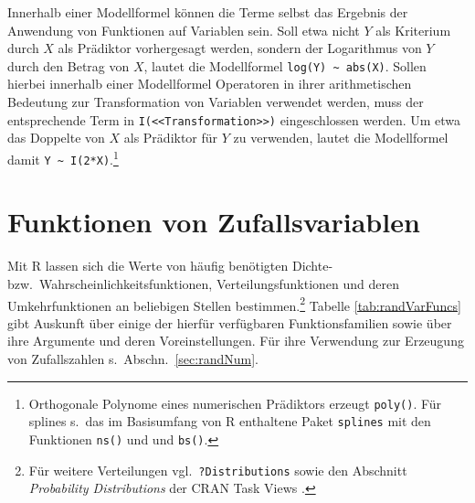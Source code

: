 Innerhalb einer Modellformel können die Terme selbst das Ergebnis der Anwendung von Funktionen auf Variablen sein. Soll etwa nicht $Y$ als Kriterium durch $X$ als Prädiktor vorhergesagt werden, sondern der Logarithmus von $Y$ durch den Betrag von $X$, lautet die Modellformel \lstinline!log(Y) ~ abs(X)!. Sollen hierbei innerhalb einer Modellformel Operatoren in ihrer arithmetischen Bedeutung zur Transformation von Variablen verwendet werden, muss der entsprechende Term in \lstinline!I(<<Transformation>>)! eingeschlossen werden. Um etwa das Doppelte von $X$ als Prädiktor für $Y$ zu verwenden, lautet die Modellformel damit \lstinline!Y ~ I(2*X)!.\footnote{Orthogonale Polynome eines numerischen Prädiktors erzeugt \lstinline!poly()!. Für splines s.\ das im Basisumfang von R enthaltene Paket \lstinline!splines! mit den Funktionen \lstinline!ns()! und und \lstinline!bs()!.}

\section{Funktionen von Zufallsvariablen}
\label{sec:randVarFuncs}

Mit R lassen sich die Werte von häufig benötigten Dichte- bzw.\ Wahrscheinlichkeitsfunktionen, Verteilungsfunktionen und deren Umkehrfunktionen an beliebigen Stellen bestimmen.\footnote{Für weitere Verteilungen vgl.\ \lstinline!?Distributions! sowie den Abschnitt \emph{Probability Distributions} der CRAN Task Views \cite{CRANtvProbDistr}.} Tabelle \ref{tab:randVarFuncs} gibt Auskunft über einige der hierfür verfügbaren Funktionsfamilien sowie über ihre Argumente und deren Voreinstellungen. Für ihre Verwendung zur Erzeugung von Zufallszahlen s.\ Abschn.\ \ref{sec:randNum}.

